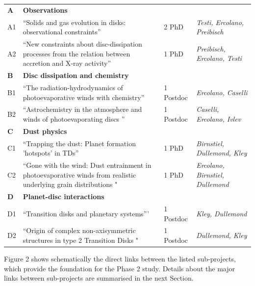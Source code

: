 \documentclass[10pt,fleqn,twoside]{article}
\newcommand{\AreacolA}{\color{blue}}
\newcommand{\AreacolB}{\color{Green}}
\newcommand{\AreacolC}{\color{YellowOrange}}
\newcommand{\AreacolD}{\color{Red}}
\begin{document}
\noindent
\begin{tabular}{p{1cm}p{8cm}p{2.0cm}p{3.9cm}}
\hline
{\bf\AreacolA A} & {\bf\AreacolA Observations} & & \\ 
A1 & ``Solids and gas evolution in disks: observational constraints'' & 2 PhD & {\em Testi, Ercolano, Preibisch}\\
A2 & ``New constraints about disc-dissipation processes from the relation between accretion and X-ray activity'' & 1 PhD & {\em Preibisch, Ercolano, Testi}\\
\hline
{\bf\AreacolB B} & {\bf\AreacolB Disc dissipation and chemistry} & & \\ 
B1 & ``The radiation-hydrodynamics of photoevaporative winds with chemistry'' & 1 Postdoc & {\em Ercolano, Caselli}\\
B2 & ``Astrochemistry in the atmosphere and winds of photoevaporating discs '' & 1 Postdoc & {\em
                                                              Caselli,
                                                              Ercolano,
                                                              Ivlev}\\
\hline
{\bf\AreacolC C} & {\bf\AreacolC Dust physics} & & \\ 
C1 & ``Trapping the dust: Planet formation 'hotspots' in TDs'' & 1 PhD
                               & {\em Birnstiel, Dullemond, Kley}\\
C2 & ``Gone with the wind: Dust entrainment in photoevaporative winds
     from realistic underlying grain distributions "& 1 PhD & {\em
                                                              Ercolano,
                                                              Birnstiel,
                                                              Dullemond}\\
\hline
{\bf\AreacolD D} & {\bf\AreacolD Planet-disc interactions} & & \\ 
D1 & ``Transition disks and planetary systems''' & 1 Postdoc & {\em Kley, Dullemond}\\
D2 & ``Origin of complex non-axisymmetric structures in type 2
     Transition Disks "& 1 Postdoc & {\em Dullemond, Kley}\\
\hline
\end{tabular}
\vspace{1.5em}

Figure 2 shows schematically the direct links between the listed sub-projects, which provide the foundation for the Phase 2 study. Details about the major links between sub-projects are summarised in the next Section. 
\end{document}
